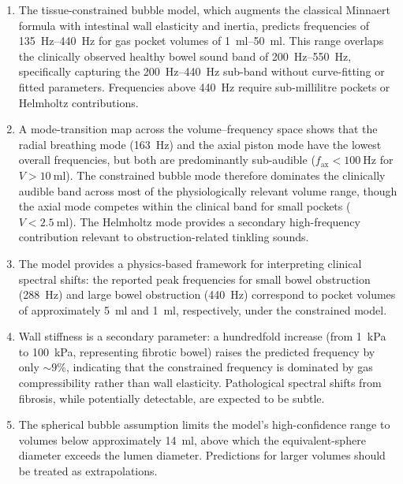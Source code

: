\documentclass[12pt]{article}
\begin{document}
\begin{enumerate}
  \item The tissue-constrained bubble model, which augments the classical
    Minnaert formula with intestinal wall elasticity and inertia, predicts
    frequencies of \SIrange{135}{440}{\hertz} for gas pocket volumes of
    \SIrange{1}{50}{\milli\litre}.  This range overlaps the clinically
    observed healthy bowel sound band of \SIrange{200}{550}{\hertz},
    specifically capturing the \SIrange{200}{440}{\hertz} sub-band without
    curve-fitting or fitted parameters.  Frequencies above
    \SI{440}{\hertz} require sub-millilitre pockets or Helmholtz
    contributions.

  \item A mode-transition map across the volume--frequency space shows that
    the radial breathing mode (\SI{163}{\hertz}) and the axial piston mode
    have the lowest overall frequencies, but both are predominantly
    sub-audible ($f_\mathrm{ax} < \SI{100}{\hertz}$ for $V >
    \SI{10}{\milli\litre}$).  The constrained bubble mode therefore dominates
    the clinically audible band across most of the physiologically relevant
    volume range, though the axial mode competes within the clinical band
    for small pockets ($V < \SI{2.5}{\milli\litre}$).  The
    Helmholtz mode provides a secondary high-frequency contribution
    relevant to obstruction-related tinkling sounds.

  \item The model provides a physics-based framework for interpreting
    clinical spectral shifts: the reported peak frequencies for small bowel
    obstruction (\SI{288}{\hertz}) and large bowel obstruction
    (\SI{440}{\hertz}) correspond to pocket volumes of approximately
    \SI{5}{\milli\litre} and \SI{1}{\milli\litre}, respectively, under the
    constrained model.

  \item Wall stiffness is a secondary parameter: a hundredfold increase
    (from \SI{1}{\kilo\pascal} to \SI{100}{\kilo\pascal}, representing
    fibrotic bowel) raises the predicted frequency by only ${\sim}9\%$,
    indicating that the constrained frequency is dominated by gas
    compressibility rather than wall elasticity.  Pathological spectral
    shifts from fibrosis, while potentially detectable, are expected to
    be subtle.

  \item The spherical bubble assumption limits the model's high-confidence
    range to volumes below approximately \SI{14}{\milli\litre}, above which
    the equivalent-sphere diameter exceeds the lumen diameter.  Predictions
    for larger volumes should be treated as extrapolations.
\end{enumerate}
\end{document}
